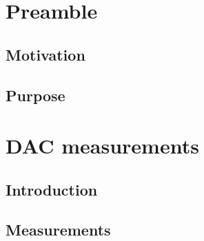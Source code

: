 \documentclass[11pt]{report}
\begin{document}

%

\newpage
\tableofcontents  

%




\listoffigures 


\pagestyle{headings}

\chapter{Preamble}
\label{kap:Einleitung} 

\section{Motivation}



\section{Purpose}

\chapter{DAC measurements}
\section{Introduction}
\section{Measurements}
\end{document}
